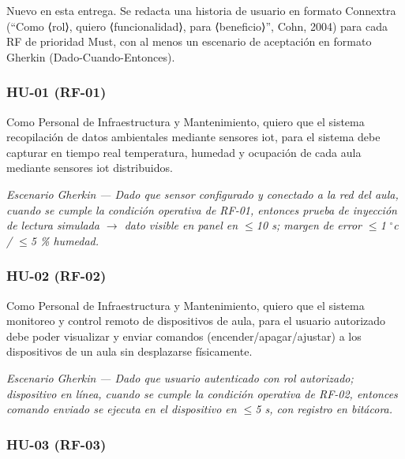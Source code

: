 
Nuevo en esta entrega. Se redacta una historia de usuario en formato Connextra (``Como ⟨rol⟩, quiero ⟨funcionalidad⟩, para ⟨beneficio⟩'', Cohn, 2004) para cada RF de prioridad Must, con al menos un escenario de aceptación en formato Gherkin (Dado-Cuando-Entonces).


\subsubsection*{HU-01 (RF-01)}


Como Personal de Infraestructura y Mantenimiento, quiero que el sistema recopilación de datos ambientales mediante sensores iot, para el sistema debe capturar en tiempo real temperatura, humedad y ocupación de cada aula mediante sensores iot distribuidos.


\textit{Escenario }\textit{Gherkin}\textit{ --- Dado que sensor configurado y conectado a la red del aula, cuando se cumple la condición operativa de RF-01, entonces prueba de inyección de lectura simulada $\rightarrow$ dato visible en panel en $\leq$10 s; margen de error $\leq$1 }\textit{$^{\circ}$c}\textit{ / $\leq$5 \% humedad.}


\subsubsection*{HU-02 (RF-02)}


Como Personal de Infraestructura y Mantenimiento, quiero que el sistema monitoreo y control remoto de dispositivos de aula, para el usuario autorizado debe poder visualizar y enviar comandos (encender/apagar/ajustar) a los dispositivos de un aula sin desplazarse físicamente.


\textit{Escenario }\textit{Gherkin}\textit{ --- Dado que usuario autenticado con rol autorizado; dispositivo en línea, cuando se cumple la condición operativa de RF-02, entonces comando enviado se ejecuta en el dispositivo en $\leq$5 s, con registro en bitácora.}


\subsubsection*{HU-03 (RF-03)}

